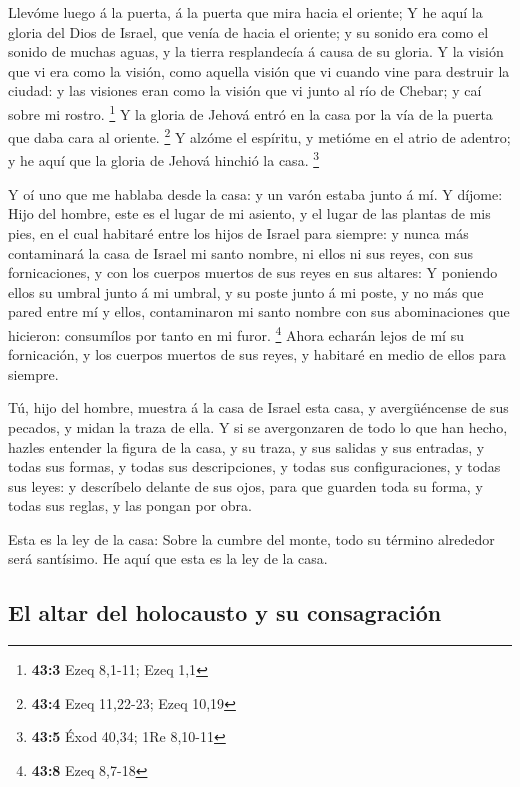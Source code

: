  Llevóme luego á la puerta, á la puerta que mira hacia el
oriente;  Y he aquí la gloria del Dios de Israel, que venía
de hacia el oriente; y su sonido era como el sonido de muchas aguas, y
la tierra resplandecía á causa de su gloria.  Y la visión
que vi era como la visión, como aquella visión que vi cuando vine para
destruir la ciudad: y las visiones eran como la visión que vi junto al
río de Chebar; y caí sobre mi rostro. \footnote{\textbf{43:3} Ezeq
  8,1-11; Ezeq 1,1}  Y la gloria de Jehová entró en la casa
por la vía de la puerta que daba cara al oriente. \footnote{\textbf{43:4}
  Ezeq 11,22-23; Ezeq 10,19}  Y alzóme el espíritu, y
metióme en el atrio de adentro; y he aquí que la gloria de Jehová
hinchió la casa. \footnote{\textbf{43:5} Éxod 40,34; 1Re 8,10-11}

 Y oí uno que me hablaba desde la casa: y un varón estaba
junto á mí.  Y díjome: Hijo del hombre, este es el lugar de
mi asiento, y el lugar de las plantas de mis pies, en el cual habitaré
entre los hijos de Israel para siempre: y nunca más contaminará la casa
de Israel mi santo nombre, ni ellos ni sus reyes, con sus fornicaciones,
y con los cuerpos muertos de sus reyes en sus altares:  Y
poniendo ellos su umbral junto á mi umbral, y su poste junto á mi poste,
y no más que pared entre mí y ellos, contaminaron mi santo nombre con
sus abominaciones que hicieron: consumílos por tanto en mi furor.
\footnote{\textbf{43:8} Ezeq 8,7-18}  Ahora echarán lejos de
mí su fornicación, y los cuerpos muertos de sus reyes, y habitaré en
medio de ellos para siempre.

 Tú, hijo del hombre, muestra á la casa de Israel esta
casa, y avergüéncense de sus pecados, y midan la traza de ella.
 Y si se avergonzaren de todo lo que han hecho, hazles
entender la figura de la casa, y su traza, y sus salidas y sus entradas,
y todas sus formas, y todas sus descripciones, y todas sus
configuraciones, y todas sus leyes: y descríbelo delante de sus ojos,
para que guarden toda su forma, y todas sus reglas, y las pongan por
obra.

 Esta es la ley de la casa: Sobre la cumbre del monte, todo
su término alrededor será santísimo. He aquí que esta es la ley de la
casa.

\hypertarget{el-altar-del-holocausto-y-su-consagraciuxf3n}{%
\subsection{El altar del holocausto y su
consagración}\label{el-altar-del-holocausto-y-su-consagraciuxf3n}}

